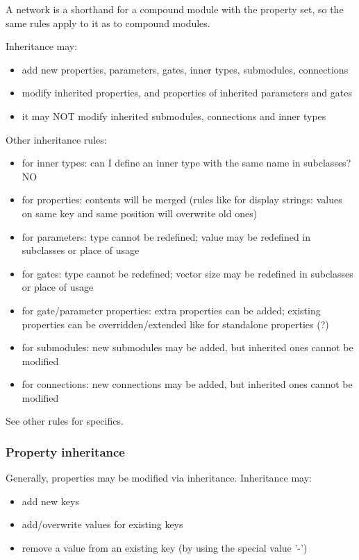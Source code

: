 A network is a shorthand for a compound module with the 
property set, so the same rules apply to it as to compound modules.

Inheritance may:
\begin{itemize}
    \item add new properties, parameters, gates, inner types, submodules,
          connections
    \item modify inherited properties, and properties of inherited parameters and
          gates
    \item it may NOT modify inherited submodules, connections and inner types
\end{itemize}

Other inheritance rules:
\begin{itemize}
    \item  for inner types:
       can I define an inner type with the same name in subclasses? NO
    \item  for properties:
       contents will be merged (rules like for display strings: values on
       same key and same position will overwrite old ones)
    \item for parameters:
       type cannot be redefined;
       value may be redefined in subclasses or place of usage
    \item  for gates:
       type cannot be redefined;
       vector size may be redefined in subclasses or place of usage
    \item  for gate/parameter properties:
       extra properties can be added;
       existing properties can be overridden/extended like for standalone properties (?)
    \item  for submodules:
       new submodules may be added, but inherited ones cannot be modified
    \item  for connections:
       new connections may be added, but inherited ones cannot be modified
\end{itemize}

See other rules for specifics.

\subsubsection{Property inheritance}

Generally, properties may be modified via inheritance. Inheritance may:

\begin{itemize}
    \item add new keys
    \item add/overwrite values for existing keys
    \item remove a value from an existing key (by using the special value '-')
\end{itemize}


